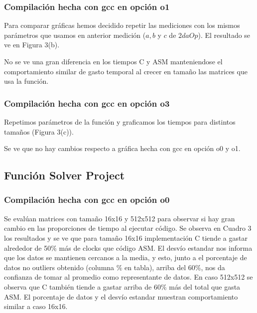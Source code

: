 \subsubsection{Compilación hecha con gcc en opción o1}
Para comparar gráficas hemos decidido repetir las mediciones con los mismos parámetros que usamos en anterior medición ($a, b$ y $c$ de $2daOp$). El resultado se ve en Figura 3(b).

  
No se ve una gran diferencia en los tiempos C y ASM manteniendose el comportamiento similar de gasto temporal al crecer en tamaño las matrices que usa la función.
  
\subsubsection{Compilación hecha con gcc en opción o3}
Repetimos parámetros de la función y graficamos los tiempos para distintos tamaños (Figura 3(c)).

  
Se ve que no hay cambios respecto a gráfica hecha con gcc en opción o0 y o1. 

\subsection{Función Solver Project}

\subsubsection{Compilación hecha con gcc en opción o0} 
Se evalúan matrices con tamaño 16x16 y 512x512 para observar si hay gran cambio en las proporciones de tiempo al ejecutar código. Se observa en Cuadro 3 los resultados y se ve que para tamaño 16x16 implementación C tiende a gastar alrededor de 50$\%$ más de clocks que código ASM.
El desvío estandar nos informa que los datos se mantienen cercanos a la media, y esto, junto a el porcentaje de datos no outliers obtenido (columna $\%$ en tabla), arriba del 60$\%$, nos da confianza de tomar al promedio como representante de datos. En caso 512x512 se observa que C también tiende a gastar arriba de 60$\%$ más del total que gasta ASM. El porcentaje de datos y el desvío estandar muestran comportamiento similar a caso 16x16. 
  

